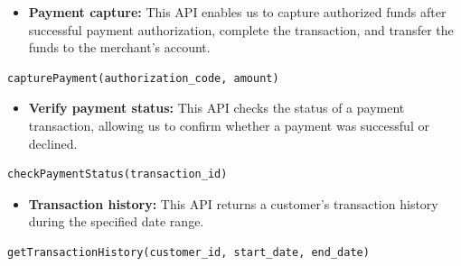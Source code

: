 \begin{itemize}
\item
\protect{}\label{j-RuuWPXWcB1Ielal3eBV}
\textbf{Payment capture:} This API enables us to capture authorized funds after successful payment authorization, complete the transaction, and transfer the funds to the merchant's account.
\end{itemize}

\begin{lstlisting}[language=plaintext]
capturePayment(authorization_code, amount)
\end{lstlisting}

\begin{table}[htbp]
\centering
\small
{}
\end{table}

\begin{itemize}
\item
\protect{}\label{A9GZiDJ1g8xJJvUPNuSQd}
\textbf{Verify payment status:} This API checks the status of a payment transaction, allowing us to confirm whether a payment was successful or declined.
\end{itemize}

\begin{lstlisting}[language=plaintext]
checkPaymentStatus(transaction_id)
\end{lstlisting}

\begin{itemize}
\item
\protect{}\label{5uRkQaLbO6VxJvldxnMz6}
\textbf{Transaction history:} This API returns a customer's transaction history during the specified date range.
\end{itemize}

\begin{lstlisting}[language=plaintext]
getTransactionHistory(customer_id, start_date, end_date)
\end{lstlisting}

